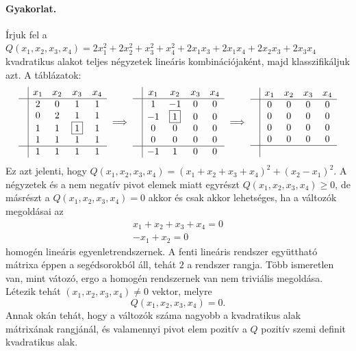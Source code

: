 \documentclass[a4paper, showtrims]{memoir}
\theoremstyle{plain}
\theoremstyle{remark}
\theoremstyle{definition}
\begin{document}
\paragraph{Gyakorlat.}
Írjuk fel a 
\(
Q\left( x_1,x_2,x_3,x_4 \right)=
2x_1^2+2x_2^2+x_3^2+x_4^2+
2x_1x_3+2x_1x_4+
2x_2x_3+
2x_3x_4
\)
kvadratikus alakot teljes négyzetek lineáris kombinációjaként, majd klasszifikáljuk azt.
A táblázatok:
\[
\begin{array}{c|cccc}
     & x_1       & x_2 & x_3 & x_4\\
     \hline
     & 2 & 0   &        1  & 1  \\
     & 0 & 2   &        1  & 1  \\
     & 1 & 1   & \boxed{1} & 1  \\
     & 1 & 1   &        1  & 1  \\
    \hline
    & 1  & 1   &        1  & 1
\end{array}
\implies
\begin{array}{c|cccc}
     & x_1& x_2  & x_3  & x_4\\
     \hline
     & 1 &       -1  & 0 & 0 \\
     & -1& \boxed{1} & 0 & 0 \\
     & 0 &        0  & 0 & 0 \\
     & 0 &        0  & 0 & 0 \\
     \hline
     &-1 &        1  & 0 & 0
\end{array}
\implies
\begin{array}{c|cccc}
     & x_1 & x_2 & x_3 &x_4\\
     \hline
     & 0 & 0 & 0 & 0 \\
     & 0 & 0 & 0 & 0 \\
     & 0 & 0 & 0 & 0 \\
     & 0 & 0 & 0 & 0 \\
    \hline
     & & & & 
\end{array}
\]
Ez azt jelenti, hogy 
\(
Q\left( x_1,x_2,x_3,x_4 \right)
=
\left( x_1+x_2+x_3+x_4 \right)^2
+\left( x_2-x_1 \right)^2.
\)
A négyzetek és a nem negatív pivot elemek miatt egyrészt $Q\left( x_1,x_2,x_3,x_4 \right)\geq 0$,
de másrészt 
a $Q\left( x_1,x_2,x_3,x_4 \right)=0$ akkor és csak akkor lehetséges, 
ha a változók megoldásai az
\[
\begin{array}{r}
    x_1+x_2+x_3+x_4= 0\\
    -x_1+x_2= 0
\end{array}
\]
homogén lineáris egyenletrendszernek.
A fenti lineáris rendszer együttható mátrixa éppen a segédsorokból áll, tehát $2$ a rendszer rangja.
Több ismeretlen van, mint vátozó, ergo a homogén rendszernek van nem triviális megoldása.
Létezik tehát $\left( x_1,x_2,x_3,x_4 \right)\neq 0$ vektor, melyre
\[
    Q\left( x_1,x_2,x_3,x_4 \right)=0.
\]
Annak okán tehát, 
hogy a változók száma nagyobb a kvadratikus alak mátrixának rangjánál, 
és valamennyi pivot elem pozitív a $Q$ pozitív szemi definit kvadratikus alak.
\end{document}

